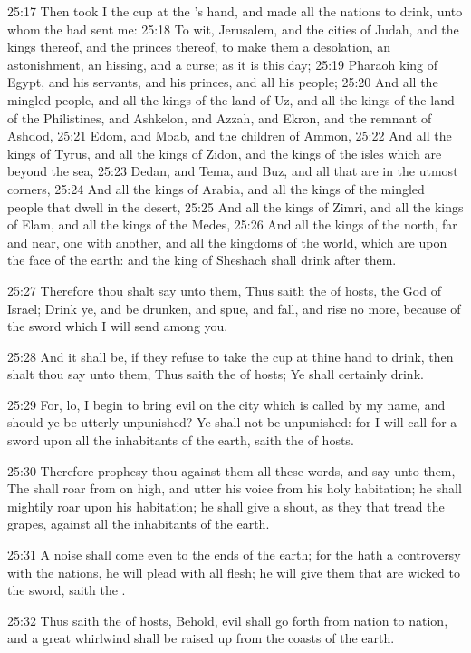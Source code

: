 25:17 Then took I the cup at the \LORD's hand, and made all the nations
to drink, unto whom the \LORD had sent me: 25:18 To wit, Jerusalem, and
the cities of Judah, and the kings thereof, and the princes thereof,
to make them a desolation, an astonishment, an hissing, and a curse;
as it is this day; 25:19 Pharaoh king of Egypt, and his servants, and
his princes, and all his people; 25:20 And all the mingled people, and
all the kings of the land of Uz, and all the kings of the land of the
Philistines, and Ashkelon, and Azzah, and Ekron, and the remnant of
Ashdod, 25:21 Edom, and Moab, and the children of Ammon, 25:22 And all
the kings of Tyrus, and all the kings of Zidon, and the kings of the
isles which are beyond the sea, 25:23 Dedan, and Tema, and Buz, and
all that are in the utmost corners, 25:24 And all the kings of Arabia,
and all the kings of the mingled people that dwell in the desert,
25:25 And all the kings of Zimri, and all the kings of Elam, and all
the kings of the Medes, 25:26 And all the kings of the north, far and
near, one with another, and all the kingdoms of the world, which are
upon the face of the earth: and the king of Sheshach shall drink after
them.

25:27 Therefore thou shalt say unto them, Thus saith the \LORD of
hosts, the God of Israel; Drink ye, and be drunken, and spue, and
fall, and rise no more, because of the sword which I will send among
you.

25:28 And it shall be, if they refuse to take the cup at thine hand to
drink, then shalt thou say unto them, Thus saith the \LORD of hosts; Ye
shall certainly drink.

25:29 For, lo, I begin to bring evil on the city which is called by my
name, and should ye be utterly unpunished? Ye shall not be unpunished:
for I will call for a sword upon all the inhabitants of the earth,
saith the \LORD of hosts.

25:30 Therefore prophesy thou against them all these words, and say
unto them, The \LORD shall roar from on high, and utter his voice from
his holy habitation; he shall mightily roar upon his habitation; he
shall give a shout, as they that tread the grapes, against all the
inhabitants of the earth.

25:31 A noise shall come even to the ends of the earth; for the \LORD
hath a controversy with the nations, he will plead with all flesh; he
will give them that are wicked to the sword, saith the \LORD.

25:32 Thus saith the \LORD of hosts, Behold, evil shall go forth from
nation to nation, and a great whirlwind shall be raised up from the
coasts of the earth.

